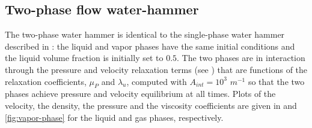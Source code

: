 \documentclass{mc2015}
\begin{document}
%
\subsection{Two-phase flow water-hammer} \label{sec:two-num-res}
%
The two-phase water hammer is identical to the single-phase water hammer described in : the liquid and vapor phases have the same initial conditions and the liquid volume fraction is initially set to $0.5$. The two phases are in interaction through the pressure and velocity relaxation terms (see ) that are functions of the relaxation coefficients, $\mu_P$ and $\lambda_u$, computed with $A_{int} = 10^3$ $m^{-1}$ so that the two phases achieve pressure and velocity equilibrium at all times. Plots of the velocity, the density, the pressure and the viscosity coefficients are given in  and \ref{fig:vapor-phase} for the liquid and gas phases, respectively.
%
\end{document}
